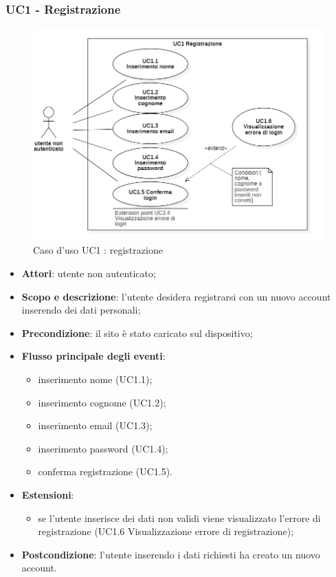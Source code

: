 \subsubsection{UC1 - Registrazione}
\begin{figure}[H]
	\centering
	\includegraphics[width=0.8\linewidth]{res/images/UC1.png}
	\caption{Caso d'uso UC1 : registrazione}
\end{figure}
\begin{itemize}
\item \textbf{Attori}: utente non autenticato;
\item \textbf{Scopo e descrizione}: l’utente desidera registrarsi con un nuovo account inserendo dei dati personali;
\item \textbf{Precondizione}: il sito è stato caricato sul dispositivo;
\item \textbf{Flusso principale degli eventi}:
\begin{itemize}
    \item inserimento nome (UC1.1);
    \item inserimento cognome (UC1.2);
    \item inserimento email (UC1.3);
    \item inserimento password (UC1.4);
    \item conferma registrazione (UC1.5).
\end{itemize}
\item \textbf{Estensioni}:
\begin{itemize}
    \item se l’utente inserisce dei dati non validi viene visualizzato l’errore di registrazione (UC1.6 Visualizzazione errore di registrazione);
\end{itemize}
\item \textbf{Postcondizione}: l’utente inserendo i dati richiesti ha creato un nuovo account.
\end{itemize}

